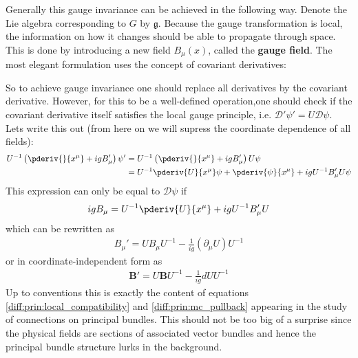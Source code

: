 	Generally this gauge invariance can be achieved in the following way. Denote the Lie algebra corresponding to $G$ by $\mathfrak{g}$. Because the gauge transformation is local, the information on how it changes should be able to propagate through space. This is done by introducing a new field $B_\mu(x)$, called the \textbf{gauge field}. The most elegant formulation uses the concept of covariant derivatives:

	So to achieve gauge invariance one should replace all derivatives by the covariant derivative. However, for this to be a well-defined operation,one should check if the covariant derivative itself satisfies the local gauge principle, i.e. $\mathcal{D}'\psi' = U\mathcal{D}\psi$. Lets write this out (from here on we will supress the coordinate dependence of all fields):
	\begin{align}
		U^{-1}\left(\pderiv{}{x^\mu} + igB_\mu'\right)\psi' &= U^{-1}\left(\pderiv{}{x^\mu} + igB_\mu'\right)U\psi\nonumber\\
		&= U^{-1}\pderiv{U}{x^\mu}\psi + \pderiv{\psi}{x^\mu} + igU^{-1}B_\mu'U\psi
	\end{align}
	This expression can only be equal to $\mathcal{D}\psi$ if
	\begin{gather}
		igB_\mu = U^{-1}\pderiv{U}{x^\mu} + igU^{-1}B_\mu'U
	\end{gather}
	which can be rewritten as
	\begin{gather}
		B_\mu' = UB_\mu U^{-1} - \frac{1}{ig}(\partial_\mu U)U^{-1}
	\end{gather}
	or in coordinate-independent form as
	\begin{gather}
		\boxed{\mathbf{B}' = U\mathbf{B}U^{-1} - \frac{1}{ig}dUU^{-1}}
	\end{gather}
	Up to conventions this is exactly the content of equations \ref{diff:prin:local_compatibility} and \ref{diff:prin:mc_pullback} appearing in the study of connections on principal bundles. This should not be too big of a surprise since the physical fields are sections of associated vector bundles and hence the principal bundle structure lurks in the background.

